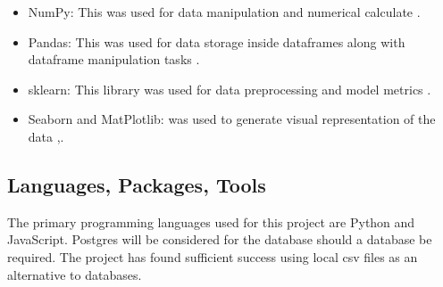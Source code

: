     \begin{itemize}
        \item NumPy: This was used for data manipulation and numerical calculate \citep{harris2020array}.
        \item Pandas: This was used for data storage inside dataframes along with dataframe manipulation tasks \citep{reback2020pandas}.
        \item sklearn: This library was used for data preprocessing and model metrics \citep{scikit-learn}.
        \item Seaborn and MatPlotlib: was used to generate visual representation of the data \citep{Waskom2021},\citep{Hunter:2007}.
    \end{itemize}

   





             
\subsection{Languages, Packages, Tools}
The primary programming languages used for this project are Python and JavaScript.
Postgres will be considered for the database should a database be required. The project has found sufficient success using local csv files as an alternative to databases.

